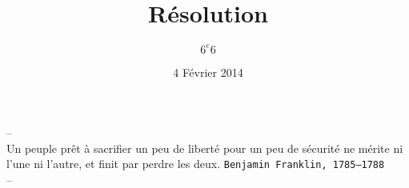 \documentclass[11pt]{article}
\title{Résolution} %
\author{$6^e 6$}
\date{4 Février 2014} %
\begin{document}

\begin{center}
  \textsf{--}\\
  \textsf{Un peuple prêt à sacrifier un peu de liberté pour un peu de sécurité ne mérite ni l'une ni l'autre, et finit par perdre les deux.}
  \texttt{Benjamin Franklin, 1785–1788}\\
  \textsf{--}
\end{center}

\vspace{-0.5cm}

\setlength{\columnseprule}{1pt}
\begin{multicols}{2}



\end{multicols}
\end{document}

